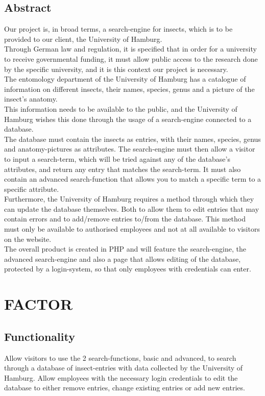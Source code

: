 \documentclass[12pt,a4paper]{article}
\begin{document}
\subsection{Abstract}
Our project is, in broad terms, a search-engine for insects, which is to be provided to our client, the University of Hamburg.\\
Through German law and regulation, it is specified that in order for a university to receive governmental funding, it must allow public access to the research done by the specific university, and it is this context our project is necessary.\\
The entomology department of the University of Hamburg has a catalogue of information on different insects, their names, species, genus and a picture of the insect’s anatomy.\\
This information needs to be available to the public, and the University of Hamburg wishes this done through the usage of a search-engine connected to a database.\\
The database must contain the insects as entries, with their names, species, genus and anatomy-pictures as attributes. The search-engine must then allow a visitor to input a search-term, which will be tried against any of the database’s attributes, and return any entry that matches the search-term.
It must also contain an advanced search-function that allows you to match a specific term to a specific attribute.\\
Furthermore, the University of Hamburg requires a method through which they can update the database themselves. Both to allow them to edit entries that may contain errors and to add/remove entries to/from the database. This method must only be available to authorised employees and not at all available to visitors on the website. \\
The overall product is created in PHP and will feature the search-engine, the advanced search-engine and also a page that allows editing of the database, protected by a login-system, so that only employees with credentials can enter.
\newpage

\section{FACTOR}
\subsection{Functionality}
Allow visitors to use the 2 search-functions, basic and advanced, to search through a database of insect-entries with data collected by the University of Hamburg.
Allow employees with the necessary login credentials to edit the database to either remove entries, change existing entries or add new entries.
\end{document}
